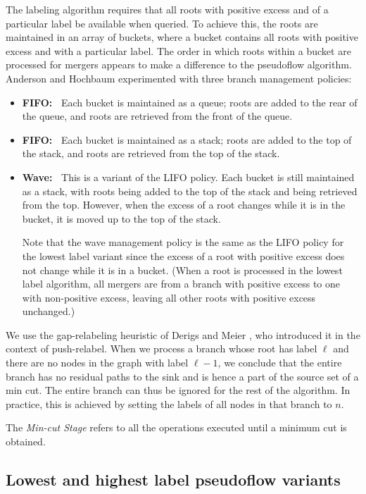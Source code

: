 \documentclass{article}
\newcounter{gap}
\begin{document}
 The labeling algorithm requires that all roots with positive excess and of a particular label be available when queried. To achieve this, the roots are maintained in an array of buckets, where a bucket contains all roots with positive excess and with a particular label. The order in which roots within a bucket are processed for mergers appears to make a difference to the pseudoflow algorithm. Anderson and Hochbaum \cite{AndH02} experimented with three branch management policies:
\begin{itemize}
\item {\bf FIFO:~} Each bucket is maintained as a queue; roots are added to the rear of the queue, and roots are retrieved from the front of the queue.
\item {\bf FIFO:~} Each bucket is maintained as a stack; roots are added to the top of the stack, and roots are retrieved from the top of the stack.
\item {\bf Wave:~} This is a variant of the LIFO policy.  Each bucket is still maintained as a stack, with roots being added to the top of the stack and being retrieved from the top.  However, when the excess of a root changes while it is in the bucket, it is moved up to the top of the stack.

Note that the wave management policy is the same as the LIFO policy for the lowest label variant since the excess of a root with positive excess does not change while it is in a bucket. (When a root is processed in the lowest label algorithm, all mergers are from a branch with positive excess to one with non-positive excess, leaving all other roots with positive excess unchanged.)
\end{itemize}

 We use the gap-relabeling heuristic of Derigs and Meier \cite{DerM89}, who introduced it in the context of push-relabel. When we process a branch whose root has label $\ell$ and there are no nodes in the graph with label $\ell-1$, we conclude that the entire branch has no residual paths to the sink and is hence a part of the source set of a min cut. The entire branch can thus be ignored for the rest of the algorithm. In practice, this is achieved by setting the labels of all nodes in that branch to $n$.

The {\em Min-cut Stage} refers to all the operations executed until a minimum cut is obtained.

\subsection{Lowest and highest label pseudoflow variants}
\end{document}
